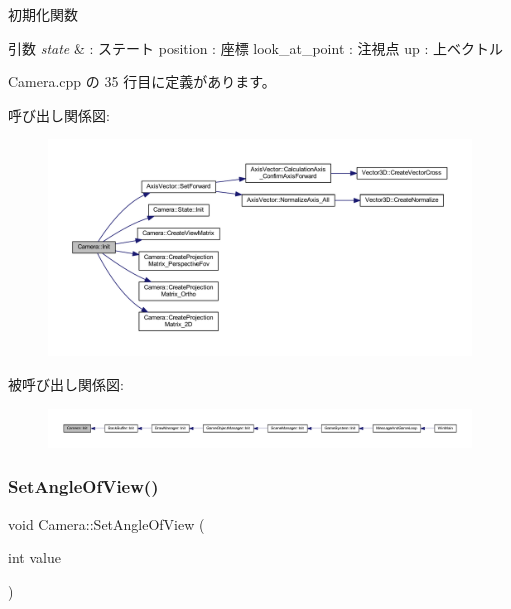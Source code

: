 初期化関数 


\begin{DoxyParams}{引数}
{\em state} & \+: ステート position \+: 座標 look\+\_\+at\+\_\+point \+: 注視点 up \+: 上ベクトル \\
\hline
\end{DoxyParams}


 Camera.\+cpp の 35 行目に定義があります。

呼び出し関係図\+:
\nopagebreak
\begin{figure}[H]
\begin{center}
\leavevmode
\includegraphics[width=350pt]{class_camera_a03e3ca8b70417632f7b1b581426ec66d_cgraph}
\end{center}
\end{figure}
被呼び出し関係図\+:
\nopagebreak
\begin{figure}[H]
\begin{center}
\leavevmode
\includegraphics[width=350pt]{class_camera_a03e3ca8b70417632f7b1b581426ec66d_icgraph}
\end{center}
\end{figure}
\mbox{\label{class_camera_a4c22c8ceed9126db627df9be7eb53a42}} 
\subsubsection{\texorpdfstring{Set\+Angle\+Of\+View()}{SetAngleOfView()}}
{\footnotesize\ttfamily void Camera\+::\+Set\+Angle\+Of\+View (\begin{DoxyParamCaption}\item[{int}]{value }\end{DoxyParamCaption})\hspace{0.3cm}{\ttfamily [inline]}}



